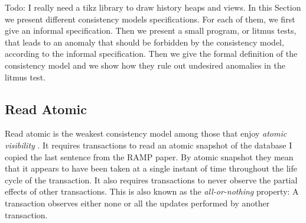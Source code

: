 

\ac{Todo: I really need a tikz library to draw history heaps and views.}
In this Section we present different consistency models specifications. 
For each of them, we first give an informal specification. Then we 
present a small program, or litmus tests, that leads to an 
anomaly that should be forbidden by the consistency model, 
according to the informal specification. 
Then we give the formal definition of the consistency model 
and we show how they rule out undesired anomalies in the litmus test. 

\subsection{Read Atomic} 
Read atomic \cite{ramp} is the weakest consistency model among 
those that enjoy \emph{atomic visibility} \cite{concur15}. 
It requires transactions to read an atomic snapshot of the database 
\ac{I copied the last sentence from the RAMP paper. By atomic snapshot 
they mean  that it appears to have been taken at a single 
instant of time throughout the life cycle of the transaction.} 
It also requires 
transactions to never observe the partial effects of other transactions. 
This is also known as the \emph{all-or-nothing} property: A transaction 
observes either none or all the updates performed by another transaction. 

